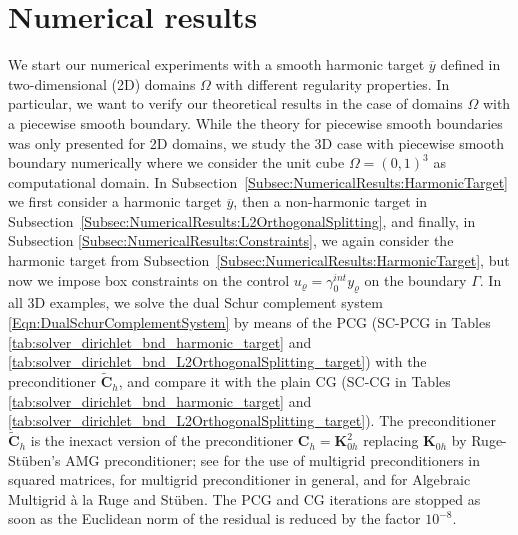 \documentclass{article}
\numberwithin{equation}{section}
\begin{document}
\section{Numerical results}\label{Sec:NumericalResults}
We start our numerical experiments with a smooth harmonic target
$\overline{y}$ defined in two-dimensional (2D) domains $\Omega$ with
different regularity properties. In particular, we want to verify our
theoretical results in the case of domains $\Omega$ with a piecewise
smooth boundary. While the theory for piecewise smooth boundaries was
only presented for 2D domains, we study the 3D case with piecewise smooth
boundary numerically where we consider the unit cube $\Omega = (0,1)^3$
as computational domain.
In Subsection~\ref{Subsec:NumericalResults:HarmonicTarget} we first consider
a harmonic target $\overline{y}$, then a non-harmonic target in
Subsection~\ref{Subsec:NumericalResults:L2OrthogonalSplitting},
and finally, in Subsection \ref{Subsec:NumericalResults:Constraints}, 
we again consider the harmonic target from
Subsection~\ref{Subsec:NumericalResults:HarmonicTarget}, but now  we impose
box constraints on the control $u_\varrho = \gamma_0^{int} y_\varrho$ 
on the boundary $\Gamma$. In all 3D examples, we solve the dual Schur
complement system \eqref{Eqn:DualSchurComplementSystem} by means of the PCG 
(SC-PCG in Tables \ref{tab:solver_dirichlet_bnd_harmonic_target} and
\ref{tab:solver_dirichlet_bnd_L2OrthogonalSplitting_target}) 
with the preconditioner $\widetilde{\mathbf{C}}_h$,
and compare it with the plain CG 
(SC-CG in Tables \ref{tab:solver_dirichlet_bnd_harmonic_target} and \ref{tab:solver_dirichlet_bnd_L2OrthogonalSplitting_target}).
The preconditioner $\widetilde{\mathbf{C}}_h$ is the inexact version of 
the preconditioner $\mathbf{C}_h = \mathbf{K}_{0h}^2$
replacing $\mathbf{K}_{0h}$ by Ruge-St\"uben's AMG preconditioner; see 
\cite{BraessPeisker:1986IMAJNA} for the use of multigrid preconditioners
in squared matrices, 
\cite{JungLangerMeyerQueckSchneider1989MGS3} for multigrid preconditioner
in general, and \cite{RugeStueben1987SIAM}  for Algebraic Multigrid \`{a}
la Ruge and St\"uben. The PCG and CG iterations are stopped as soon as the
Euclidean norm of the residual is reduced by the factor $10^{-8}$.
\end{document}
